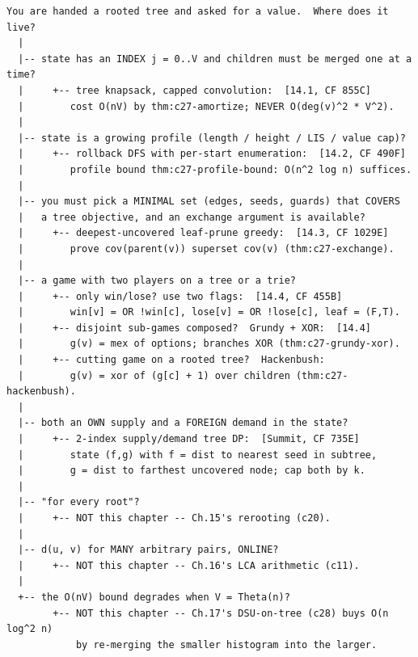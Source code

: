 \begin{lstlisting}[language={}, basicstyle=\ttfamily\small, numbers=none, frame=single]
  You are handed a rooted tree and asked for a value.  Where does it live?
  |
  |-- state has an INDEX j = 0..V and children must be merged one at a time?
  |     +-- tree knapsack, capped convolution:  [14.1, CF 855C]
  |        cost O(nV) by thm:c27-amortize; NEVER O(deg(v)^2 * V^2).
  |
  |-- state is a growing profile (length / height / LIS / value cap)?
  |     +-- rollback DFS with per-start enumeration:  [14.2, CF 490F]
  |        profile bound thm:c27-profile-bound: O(n^2 log n) suffices.
  |
  |-- you must pick a MINIMAL set (edges, seeds, guards) that COVERS
  |   a tree objective, and an exchange argument is available?
  |     +-- deepest-uncovered leaf-prune greedy:  [14.3, CF 1029E]
  |        prove cov(parent(v)) superset cov(v) (thm:c27-exchange).
  |
  |-- a game with two players on a tree or a trie?
  |     +-- only win/lose? use two flags:  [14.4, CF 455B]
  |        win[v] = OR !win[c], lose[v] = OR !lose[c], leaf = (F,T).
  |     +-- disjoint sub-games composed?  Grundy + XOR:  [14.4]
  |        g(v) = mex of options; branches XOR (thm:c27-grundy-xor).
  |     +-- cutting game on a rooted tree?  Hackenbush:
  |        g(v) = xor of (g[c] + 1) over children (thm:c27-hackenbush).
  |
  |-- both an OWN supply and a FOREIGN demand in the state?
  |     +-- 2-index supply/demand tree DP:  [Summit, CF 735E]
  |        state (f,g) with f = dist to nearest seed in subtree,
  |        g = dist to farthest uncovered node; cap both by k.
  |
  |-- "for every root"?
  |     +-- NOT this chapter -- Ch.15's rerooting (c20).
  |
  |-- d(u, v) for MANY arbitrary pairs, ONLINE?
  |     +-- NOT this chapter -- Ch.16's LCA arithmetic (c11).
  |
  +-- the O(nV) bound degrades when V = Theta(n)?
        +-- NOT this chapter -- Ch.17's DSU-on-tree (c28) buys O(n log^2 n)
            by re-merging the smaller histogram into the larger.
\end{lstlisting}



